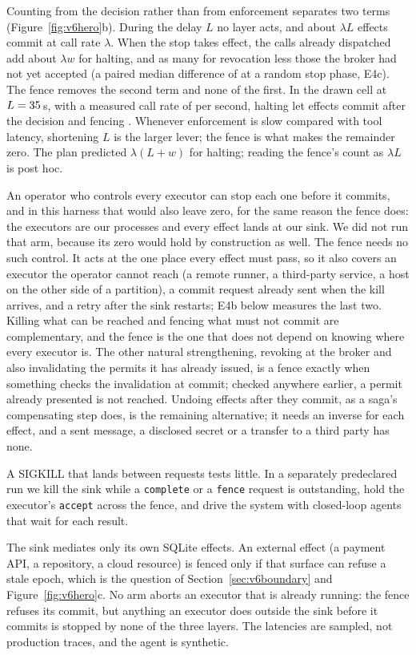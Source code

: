 Counting from the decision rather than from enforcement separates two terms
(Figure~\ref{fig:v6hero}b). During the delay \(L\) no layer acts, and about \(\lambda L\) effects commit at call rate
\(\lambda\). When the stop takes effect, the calls already dispatched add about \(\lambda w\) for halting, and as
many for revocation less those the broker had not yet accepted (a paired median difference of \vsixPhaseDiffMedian{}
at a random stop phase, E4c). The fence removes the second term and none of the first. In the drawn
cell at \(L = 35\)\,s, with a measured call rate of \vsixDelayLambda{} per second, halting let
\vsixDelayHaltAtMax{} effects commit after the decision and fencing \vsixDelayFenceAtMax. Whenever enforcement is slow
compared with tool latency, shortening \(L\) is the larger lever; the fence is what makes the remainder zero. The plan
predicted \(\lambda(L+w)\) for halting; reading the fence's count as \(\lambda L\) is post hoc.

 An operator who controls every executor can stop each one before it commits, and
in this harness that would also leave zero, for the same reason the fence does: the executors are our processes and
every effect lands at our sink. We did not run that arm, because its zero would hold by construction as well. The fence
needs no such control. It acts at the one place every effect must pass, so it also covers an executor the operator
cannot reach (a remote runner, a third-party service, a host on the other side of a partition), a commit request
already sent when the kill arrives, and a retry after the sink restarts; E4b below measures the last two. Killing what
can be reached and fencing what must not commit are complementary, and the fence is the one that does not depend on
knowing where every executor is. The other natural strengthening, revoking at the broker and also invalidating the
permits it has already issued, is a fence exactly when something checks the invalidation at commit; checked anywhere
earlier, a permit already presented is not reached. Undoing effects after they commit, as a saga's compensating step does, is the remaining
alternative; it needs an inverse for each effect, and a sent message, a disclosed secret or a transfer to a third party
has none.

 A SIGKILL that lands between requests tests little. In a separately predeclared run we kill the sink while a \texttt{complete} or a \texttt{fence} request is
outstanding, hold the executor's \texttt{accept} across the fence, and drive the system with closed-loop agents that
wait for each result. \vsixEFourBSentence

 The sink mediates only its own SQLite effects. An external effect (a payment API, a repository, a cloud
resource) is fenced only if that surface can refuse a stale epoch, which is the question of
Section~\ref{sec:v6boundary} and Figure~\ref{fig:v6hero}c. No arm aborts an executor that is already running: the
fence refuses its commit, but anything an executor does outside the sink before it commits is stopped by none of the
three layers. The latencies are sampled, not production traces, and the agent is synthetic.
